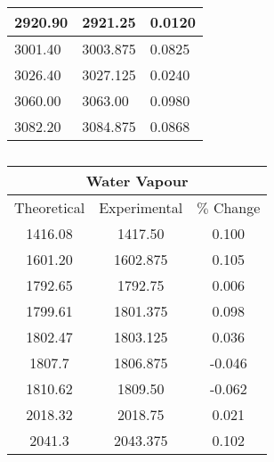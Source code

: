 \documentclass{article}
\begin{document}
\begin{appendices}
\begin{table}[h!]
\begin{tabular}{|lll|}
	\multicolumn{1}{|l|}{2920.90} & \multicolumn{1}{l|}{2921.25}  & 0.0120  \\ \hline
	\multicolumn{1}{|l|}{3001.40} & \multicolumn{1}{l|}{3003.875} & 0.0825  \\ \hline
	\multicolumn{1}{|l|}{3026.40} & \multicolumn{1}{l|}{3027.125} & 0.0240  \\ \hline
	\multicolumn{1}{|l|}{3060.00} & \multicolumn{1}{l|}{3063.00}  & 0.0980  \\ \hline
	\multicolumn{1}{|l|}{3082.20} & \multicolumn{1}{l|}{3084.875} & 0.0868  \\ \hline
	\end{tabular}
	\caption{}
	\label{tab:polystyrene}
\end{table}

\begin{table}[h!]
	\centering
	\begin{tabular}{|ccc|}
	\hline
	\multicolumn{3}{|c|}{Water Vapour}                                                  \\ \hline
	\multicolumn{1}{|c|}{Theoretical} & \multicolumn{1}{c|}{Experimental} & $\%$ Change \\ \hline
	\multicolumn{1}{|c|}{1416.08}     & \multicolumn{1}{c|}{1417.50}      & 0.100       \\ \hline
	\multicolumn{1}{|c|}{1601.20}     & \multicolumn{1}{c|}{1602.875}     & 0.105       \\ \hline
	\multicolumn{1}{|c|}{1792.65}     & \multicolumn{1}{c|}{1792.75}      & 0.006       \\ \hline
	\multicolumn{1}{|c|}{1799.61}     & \multicolumn{1}{c|}{1801.375}     & 0.098       \\ \hline
	\multicolumn{1}{|c|}{1802.47}     & \multicolumn{1}{c|}{1803.125}     & 0.036       \\ \hline
	\multicolumn{1}{|c|}{1807.7}      & \multicolumn{1}{c|}{1806.875}     & -0.046      \\ \hline
	\multicolumn{1}{|c|}{1810.62}     & \multicolumn{1}{c|}{1809.50}      & -0.062      \\ \hline
	\multicolumn{1}{|c|}{2018.32}     & \multicolumn{1}{c|}{2018.75}      & 0.021       \\ \hline
	\multicolumn{1}{|c|}{2041.3}      & \multicolumn{1}{c|}{2043.375}     & 0.102       \\ \hline
	\end{tabular}
	\caption{}
	\label{tab:watervapour}
\end{table}


\end{appendices}

\pagebreak{}

% 
% 
\end{document}
